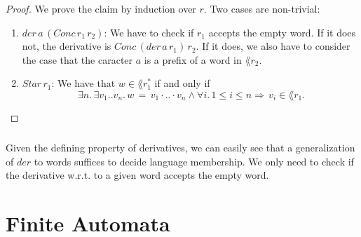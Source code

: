 \documentclass[11pt,a4paper,oneside]{book}
\begin{document}
                    \begin{proof}
                        We prove the claim by induction over $r$. Two cases are non-trivial: 
                        \begin{enumerate}
                            \item
                                $der \, a \, (Conc \, r_1 \, r_2)$: 
                                We have to check if $r_1$ accepts the empty word. 
                                If it does not, the derivative is $Conc \, (der \, a \, r_1) \, r_2$.
                                If it does, we also have to consider the case that the caracter $a$ is a prefix of a word in $\lang{r_2}$.
                            \item
                                $Star \, r_1$: 
                                We have that $w \in \lang{r_1^*}$ if and only if 
                                \[
                                    \, \exists n. \, \exists v_1 .. v_n. \, w \, = \, v_1 \cdot .. \cdot v_n 
                                    \wedge \forall i. \, 1 \leq i \leq n 
                                    \Rightarrow
                                    \, v_i \in \lang{r_1}.
                                \]
                        \end{enumerate}
                    \end{proof}

                \paragraph{} 
                    Given the defining property of derivatives, we can easily see that a generalization of $der$ to words suffices to decide language membership. We only need to check if the derivative w.r.t. to a given word accepts the empty word.


                \begin{theorem}
                    \label{mem_der_correct} 
                    
                \end{theorem}

            

    \chapter{Finite Automata}
\end{document}

